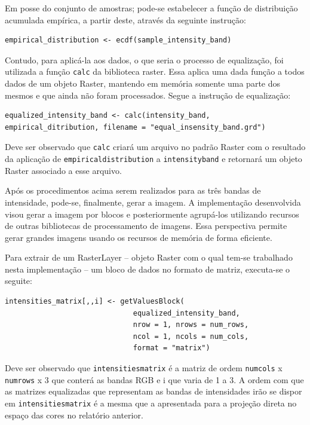 \documentclass[12pt]{article}
\begin{document}
Em posse do conjunto de amostras; pode-se estabelecer a função de distribuição acumulada empírica, a partir deste, através da seguinte instrução:

\begin{verbatim}
empirical_distribution <- ecdf(sample_intensity_band)
\end{verbatim}

Contudo, para aplicá-la aos dados, o que seria o processo de equalização, foi utilizada a função \texttt{calc} da biblioteca raster. Essa aplica uma dada função a todos dados de um objeto Raster, mantendo em memória somente uma parte dos mesmos e que ainda não foram processados. Segue a instrução de equalização:

\begin{verbatim}
equalized_intensity_band <- calc(intensity_band,
empirical_ditribution, filename = "equal_insensity_band.grd")
\end{verbatim}

Deve ser observado que \texttt{calc} criará um arquivo no padrão Raster com o resultado da aplicação de \texttt{empirical}\textunderscore \texttt{distribution} a \texttt{intensity}\textunderscore\texttt{band} e retornará um objeto Raster associado a esse arquivo.

Após os procedimentos acima serem realizados para as três bandas de intensidade, pode-se, finalmente, gerar a imagem. A implementação desenvolvida visou gerar a imagem por blocos e posteriormente agrupá-los utilizando recursos de outras bibliotecas de processamento de imagens. Essa perspectiva permite gerar grandes imagens usando os recursos de memória de forma eficiente. 

Para extrair de um RasterLayer  -- objeto Raster com o qual tem-se trabalhado nesta implementação -- um bloco de dados no formato de matriz, executa-se o seguite:

\begin{verbatim}
intensities_matrix[,,i] <- getValuesBlock(
                              equalized_intensity_band,
                              nrow = 1, nrows = num_rows,
                              ncol = 1, ncols = num_cols,
                              format = "matrix")

\end{verbatim}

Deve ser observado que \texttt{intensities}\textunderscore\texttt{matrix} é a matriz de ordem \texttt{num}\textunderscore\texttt{cols} x \texttt{num}\textunderscore\texttt{rows} x 3 que conterá as bandas RGB e i que varia de 1 a 3. A ordem com que as matrizes equalizadas que representam as bandas de intensidades irão se dispor em \texttt{intensities}\textunderscore\texttt{matrix} é a mesma que a apresentada para a projeção direta no espaço das cores no relatório anterior. 
\end{document}

